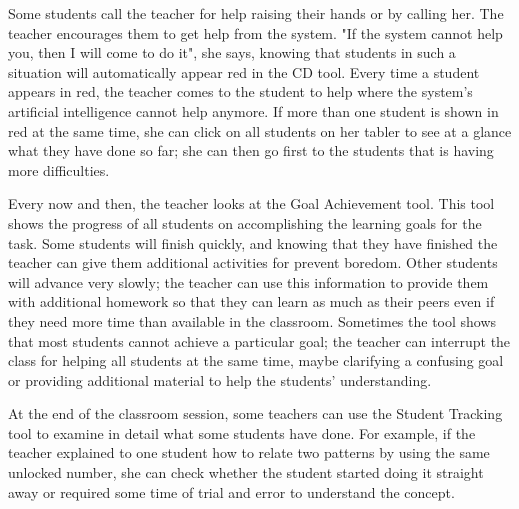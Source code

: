 Some students call the teacher for help raising their hands or by
calling her. The teacher encourages them to get help from the system.
"If the system cannot help you, then I will come to do it", she says,
knowing that students in such a situation will automatically appear
red in the CD tool. Every time a student appears in red, the teacher
comes to the student to help where the system's artificial
intelligence cannot help anymore. If more than one student is shown in
red at the same time, she can click on all students on her tabler to
see at a glance what they have done so far; she can then go first to
the students that is having more difficulties.

Every now and then, the teacher looks at the Goal Achievement tool.
This tool shows the progress of all students on accomplishing the
learning goals for the task. Some students will finish quickly, and
knowing that they have finished the teacher can give them additional
activities for prevent boredom. Other students will advance very
slowly; the teacher can use this information to provide them with
additional homework so that they can learn as much as their peers even
if they need more time than available in the classroom. Sometimes the
tool shows that most students cannot achieve a particular goal; the
teacher can interrupt the class for helping all students at the same
time, maybe clarifying a confusing goal or providing additional
material to help the students' understanding.

At the end of the classroom session, some teachers can use the Student
Tracking tool to examine in detail what some students have done. For
example, if the teacher explained to one student how to relate two
patterns by using the same unlocked number, she can check whether the
student started doing it straight away or required some time of trial
and error to understand the concept.

